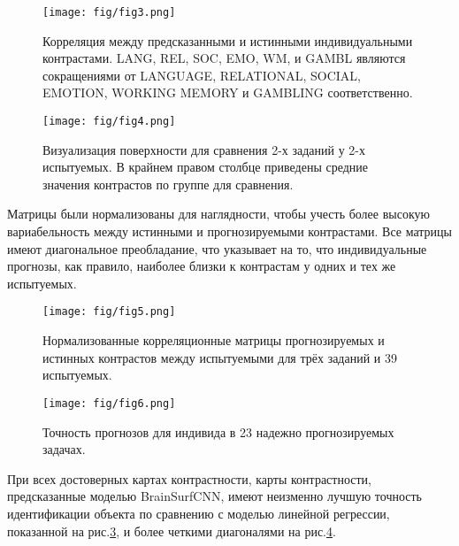 \begin{figure}
\centering
\texttt{[image: fig/fig3.png]}
\caption{Корреляция между предсказанными и истинными индивидуальными контрастами. LANG, REL, SOC, EMO, WM, и GAMBL являются сокращениями от LANGUAGE, RELATIONAL, SOCIAL, EMOTION, WORKING MEMORY и GAMBLING соответственно.}
\label{BrSurf3}
\end{figure}



\begin{figure}
\centering
\texttt{[image: fig/fig4.png]}
\caption{{Визуализация поверхности для сравнения 2-х заданий у 2-х испытуемых. В крайнем правом столбце приведены средние значения контрастов по группе для сравнения.}}
\label{BrSurf4}
\end{figure}


Матрицы были нормализованы для наглядности, чтобы учесть более высокую вариабельность между истинными и прогнозируемыми контрастами.
Все матрицы имеют диагональное преобладание, что указывает на то, что индивидуальные прогнозы, как правило, наиболее близки к контрастам у одних и тех же испытуемых.

\begin{figure}
\centering
\texttt{[image: fig/fig5.png]}
\caption{{Нормализованные корреляционные матрицы прогнозируемых и истинных контрастов между испытуемыми для трёх заданий и 39 испытуемых.}}
\label{BrSurf5}
\end{figure}


\begin{figure}
\centering
\texttt{[image: fig/fig6.png]}
\caption{{Точность прогнозов для индивида в 23 надежно прогнозируемых задачах.}}
\label{BrSurf6}
\end{figure}

При всех достоверных картах контрастности, карты контрастности, предсказанные моделью BrainSurfCNN, имеют неизменно лучшую точность идентификации объекта по сравнению с моделью линейной регрессии, показанной на рис.\ref{BrSurf5}, и более четкими диагоналями на рис.\ref{BrSurf6}.